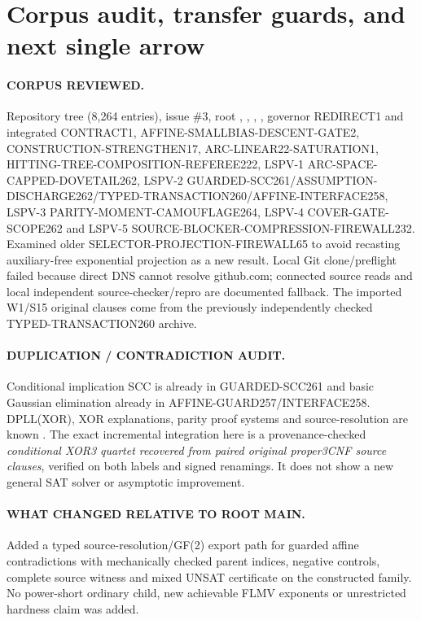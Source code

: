 \documentclass[11pt]{article}
\begin{document}
\section{Corpus audit, transfer guards, and next single arrow}
\begin{sloppypar}\paragraph{CORPUS REVIEWED.} Repository tree (8,264 entries), issue \#3, root , , , , governor REDIRECT1 and integrated CONTRACT1, AFFINE-SMALLBIAS-DESCENT-GATE2, CONSTRUCTION-STRENGTHEN17, ARC-LINEAR22-SATURATION1, HITTING-TREE-COMPOSITION-REFEREE222, LSPV-1 ARC-SPACE-CAPPED-DOVETAIL262, LSPV-2 GUARDED-SCC261/ASSUMPTION-DISCHARGE262/TYPED-TRANSACTION260/AFFINE-INTERFACE258, LSPV-3 PARITY-MOMENT-CAMOUFLAGE264, LSPV-4 COVER-GATE-SCOPE262 and LSPV-5 SOURCE-BLOCKER-COMPRESSION-FIREWALL232. Examined older SELECTOR-PROJECTION-FIREWALL65 to avoid recasting auxiliary-free exponential projection as a new result. Local Git clone/preflight failed because direct DNS cannot resolve github.com; connected source reads and local independent source-checker/repro are documented fallback. The imported W1/S15 original clauses come from the previously independently checked TYPED-TRANSACTION260 archive.

\end{sloppypar}
\paragraph{DUPLICATION / CONTRADICTION AUDIT.} Conditional implication SCC is already in GUARDED-SCC261 and basic Gaussian elimination already in AFFINE-GUARD257/INTERFACE258. DPLL(XOR), XOR explanations, parity proof systems and source-resolution are known \cite{laitinen,gocht,davis}. The exact incremental integration here is a provenance-checked \emph{conditional XOR3 quartet recovered from paired original proper3CNF source clauses}, verified on both labels and signed renamings. It does not show a new general SAT solver or asymptotic improvement.

\paragraph{WHAT CHANGED RELATIVE TO ROOT MAIN.} Added a typed source-resolution/GF(2) export path for guarded affine contradictions with mechanically checked parent indices, negative controls, complete source witness and mixed UNSAT certificate on the constructed family. No power-short ordinary child, new achievable FLMV exponents or unrestricted hardness claim was added.
\end{document}
